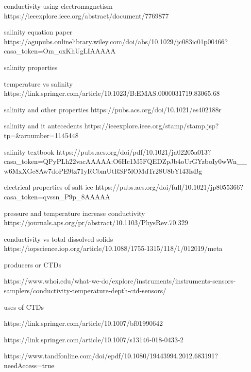 conductivity using electromagnetism https://ieeexplore.ieee.org/abstract/document/7769877

salinity equation paper https://agupubs.onlinelibrary.wiley.com/doi/abs/10.1029/jc083ic01p00466?casa_token=Om_oxKhUgLIAAAAA%

salinity properties

temperature vs salinity https://link.springer.com/article/10.1023/B:EMAS.0000031719.83065.68

salinity and other properties https://pubs.acs.org/doi/10.1021/es402188r

salinity and it antecedents https://ieeexplore.ieee.org/stamp/stamp.jsp?tp=&arnumber=1145448

salinity textbook https://pubs.acs.org/doi/pdf/10.1021/ja02205a013?casa_token=QPyPLh22vacAAAAA:O6Hc1M5FQEDZpJb4oUrGYzboIy0wWn__w6MxXGc8Aw7doPE9tz71yRCbmUtRSP5lOMdTr28U8bYI43IsBg

electrical properties of salt ice https://pubs.acs.org/doi/full/10.1021/jp8055366?casa_token=qvssn_P9p_8AAAAA%

pressure and temperature increase conductivity https://journals.aps.org/pr/abstract/10.1103/PhysRev.70.329

conductivity vs total dissolved solids https://iopscience.iop.org/article/10.1088/1755-1315/118/1/012019/meta

producers or CTDs

https://www.whoi.edu/what-we-do/explore/instruments/instruments-sensors-samplers/conductivity-temperature-depth-ctd-sensors/

uses of CTDs

https://link.springer.com/article/10.1007/bf01990642

https://link.springer.com/article/10.1007/s13146-018-0433-2

https://www.tandfonline.com/doi/epdf/10.1080/19443994.2012.683191?needAccess=true